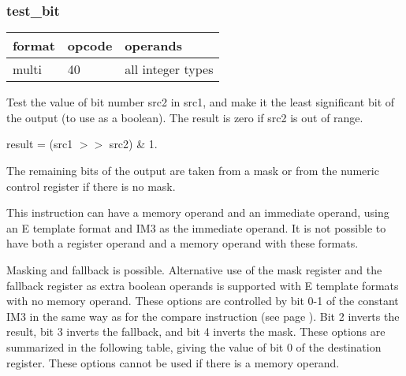 \documentclass[forwardcom.tex]{subfiles}
\begin{document}
\subsubsection{test\_bit}
\label{table:testBitInstruction}
\begin{tabular}{|p{12mm}|p{12mm}|p{110mm}|}
\hline
\bfseries format & \bfseries opcode & \bfseries operands \\ \hline
multi & 40 & all integer types \\ \hline
\end{tabular}
\vspace{2mm}

Test the value of bit number src2 in src1, and make it the least significant bit of the output (to use as a boolean). The result is zero if src2 is out of range.
\vspace{2mm}

result = (src1 $>>$ src2) \& 1.
\vspace{2mm}

The remaining bits of the output are taken from a mask or from the numeric control register if there is no mask. 

\vspace{2mm}
This instruction can have a memory operand and an immediate operand, using an E template format and IM3  as the immediate operand. It is not possible to have both a register operand and a memory operand with these formats.

\vspace{2mm}
Masking and fallback is possible. Alternative use of the mask register and the fallback register as extra boolean operands is supported with E template formats with no memory operand. These options are controlled by bit 0-1 of the constant IM3 in the same way as for the compare instruction (see page \pageref{table:AlternativeFallbackForCompare}). Bit 2 inverts the result, bit 3 inverts the fallback, and bit 4 inverts the mask. These options are summarized in the following table, giving the value of bit 0 of the destination register. These options cannot be used if there is a memory operand.
\end{document}
